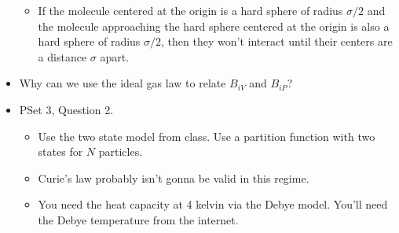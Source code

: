 \documentclass[../notes.tex]{subfiles}
\begin{document}
\begin{itemize}
    \begin{itemize}
        \item If the molecule centered at the origin is a hard sphere of radius $\sigma/2$ and the molecule approaching the hard sphere centered at the origin is also a hard sphere of radius $\sigma/2$, then they won't interact until their centers are a distance $\sigma$ apart.
    \end{itemize}
    \item Why can we use the ideal gas law to relate $B_{iV}$ and $B_{iP}$?
    \item PSet 3, Question 2.
    \begin{itemize}
        \item Use the two state model from class. Use a partition function with two states for $N$ particles.
        \item Curie's law probably isn't gonna be valid in this regime.
        \item You need the heat capacity at 4 kelvin via the Debye model. You'll need the Debye temperature from the internet.
    \end{itemize}
\end{itemize}
\end{document}
